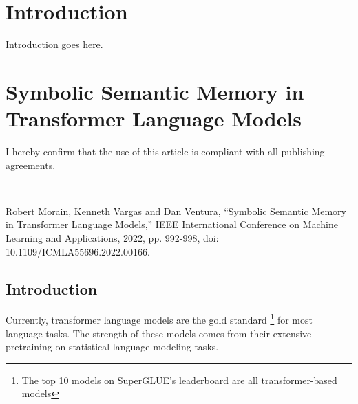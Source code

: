 \documentclass[phd,electronic,oneside,twosidetoc,letterpaper,chaptercenter,parttop,lof]{byumsphd}
\title{\Title}
\author{\Author}
\begin{document}
\maketitle
{}

\chapter{Introduction} 

Introduction goes here.

\chapter{Symbolic Semantic Memory in Transformer Language Models} 

I hereby confirm that the use of this article is compliant with all publishing agreements.

\

\noindent
Robert Morain, Kenneth Vargas and Dan Ventura, ``Symbolic Semantic Memory in Transformer Language Models,'' IEEE International Conference on Machine Learning and Applications, 2022, pp. 992-998, doi: 10.1109/ICMLA55696.2022.00166. 


\newcommand{\LMLossPercentageDecrease}{81.04\%}


\begin{abstract}
This paper demonstrates how transformer language models can be improved by giving them access to relevant structured data extracted from a knowledge base. 
The methods for doing so include identifying entities in a text corpus, sorting the entities using a novel attention-based approach, linking entities to a knowledge base, then extracting and filtering the knowledge to create a knowledge-augmented dataset.
We evaluate these methods with the WikiText-103 corpus using standard language modeling objectives.
These results show that even simple additional knowledge augmentation leads to a reduction in validation perplexity by \LMLossPercentageDecrease. 
These methods also significantly outperform common ways of improving language models such as increasing the model size or adding more data.
\end{abstract}


\section{Introduction}
Currently, transformer language models are the gold standard \footnote{The top 10 models on SuperGLUE's \cite{wang2019superglue} leaderboard are all transformer-based models} for most language tasks. 
The strength of these models comes from their extensive pretraining on statistical language modeling tasks.
\end{document}
